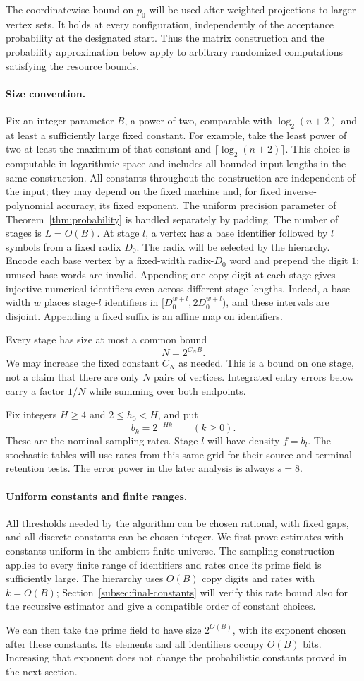 The coordinatewise bound on $p_0$ will be used after weighted projections
to larger vertex sets.  It holds at every configuration, independently
of the acceptance probability at the designated start.  Thus the matrix
construction and the probability approximation below apply to arbitrary
randomized computations satisfying the resource bounds.

\paragraph{Size convention.}
Fix an integer parameter $B$, a power of two, comparable with
$\log_2(n+2)$ and at least a sufficiently large fixed constant.
For example, take the least power of two at least the maximum of that
constant and $\lceil\log_2(n+2)\rceil$.  This choice is computable in
logarithmic space and includes all bounded input lengths in the same
construction. All constants throughout the
construction are independent of the input; they may depend on the fixed
machine and, for fixed inverse-polynomial accuracy, its fixed exponent.
The uniform precision parameter of Theorem~\ref{thm:probability} is
handled separately by padding. The number of stages is $L=O(B)$. At stage $l$, a vertex has
a base identifier followed by $l$ symbols from a fixed radix $D_0$.
The radix will be selected by the hierarchy. Encode each base vertex by
a fixed-width radix-$D_0$ word and prepend the digit $1$; unused base
words are invalid. Appending one copy digit at each stage gives
injective numerical identifiers even across different stage lengths.
Indeed, a base width $w$ places stage-$l$ identifiers in
$[D_0^{w+l},2D_0^{w+l})$, and these intervals are disjoint.
Appending a fixed suffix is an affine map on identifiers.

Every stage has size at most a common bound
\[
N=2^{C_NB}.
\]
We may increase the fixed constant $C_N$ as needed. This is a bound on
one stage, not a claim that there are only $N$ pairs of vertices.
Integrated entry errors below carry a factor $1/N$ while summing over
both endpoints.

Fix integers $H\ge4$ and $2\le h_0<H$, and put
\[
b_k=2^{-Hk}\qquad(k\ge0).
\]
These are the nominal sampling rates. Stage $l$ will have density
$f=b_l$. The stochastic tables will use rates from this same grid
for their source and terminal retention tests. The error power in
the later analysis is always $s=8$.

\paragraph{Uniform constants and finite ranges.}
All thresholds needed by the algorithm can be chosen rational, with
fixed gaps, and all discrete constants can be chosen integer. We
first prove estimates with constants uniform in the ambient finite
universe. The sampling construction applies to every finite range of
identifiers and rates once its prime field is sufficiently large.
The hierarchy uses $O(B)$ copy digits and rates with $k=O(B)$;
Section~\ref{subsec:final-constants} will verify this rate bound also
for the recursive estimator and give a compatible order of constant
choices.

We can then take the prime field to have size $2^{O(B)}$, with its
exponent chosen after these constants. Its elements and all identifiers
occupy $O(B)$ bits. Increasing that exponent does not change the
probabilistic constants proved in the next section.
